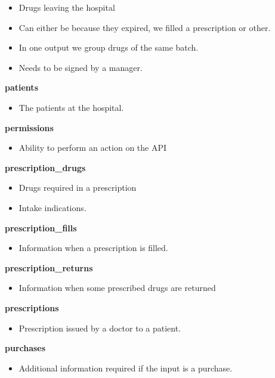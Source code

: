 \begin{itemize}
\item
  Drugs leaving the hospital
\item
  Can either be because they expired, we filled a prescription or other.
\item
  In one output we group drugs of the same batch.
\item
  Needs to be signed by a manager.
\end{itemize}

\textbf{patients}

\begin{itemize}
\tightlist
\item
  The patients at the hospital.
\end{itemize}

\textbf{permissions}

\begin{itemize}
\tightlist
\item
  Ability to perform an action on the API
\end{itemize}

\textbf{prescription\_drugs}

\begin{itemize}
\item
  Drugs required in a prescription
\item
  Intake indications.
\end{itemize}

\textbf{prescription\_fills}

\begin{itemize}
\tightlist
\item
  Information when a prescription is filled.
\end{itemize}

\textbf{prescription\_returns}

\begin{itemize}
\tightlist
\item
  Information when some prescribed drugs are returned
\end{itemize}

\textbf{prescriptions}

\begin{itemize}
\tightlist
\item
  Prescription issued by a doctor to a patient.
\end{itemize}

\textbf{purchases}

\begin{itemize}
\tightlist
\item
  Additional information required if the input is a purchase.
\end{itemize}

